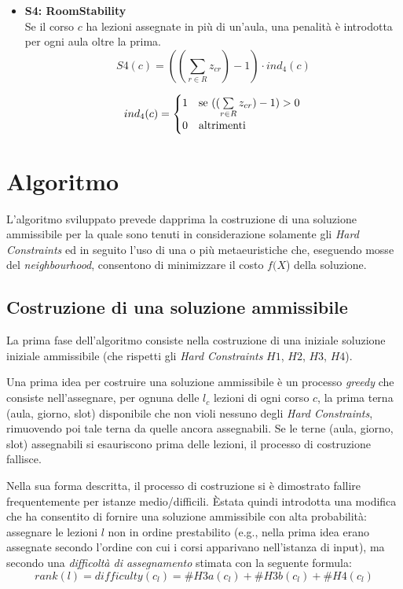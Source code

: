 \documentclass[]{article}
\newcommand{\E}{È}
\begin{document}
\begin{itemize}
	\item \textbf{S4: RoomStability} \mbox{}\\	

Se il corso $c$ ha lezioni assegnate in più di un'aula, una penalità è introdotta per ogni aula oltre la prima.
	\[ S4(c) = ((\sum_{r \in R} z_{cr}) - 1)  \cdot ind_4(c)\]

	\[ 
	ind_4(c) = 
	\begin{cases}
		1 & \text{se $ ((\sum\limits_{r \in R} z_{cr}) - 1) > 0 $} \\
		0 & \text{altrimenti}
	\end{cases}\\
	\]

\end{itemize}

\section{Algoritmo}
L'algoritmo sviluppato prevede dapprima la costruzione di una soluzione ammissibile per la quale sono tenuti in considerazione solamente gli \textit{Hard Constraints} ed in seguito l'uso di una o più metaeuristiche che, eseguendo mosse del \textit{neighbourhood}, consentono di minimizzare il costo $f(X$) della soluzione.

\subsection{Costruzione di una soluzione ammissibile}
La prima fase dell'algoritmo consiste nella costruzione di una iniziale soluzione iniziale ammissibile (che rispetti gli \textit{Hard Constraints} $H1$, $H2$, $H3$, $H4$).

Una prima idea per costruire una soluzione ammissibile è un processo \textit{greedy} che consiste nell'assegnare, per ognuna delle $l_c$ lezioni di ogni corso $c$, la prima terna (aula, giorno, slot) disponibile che non violi nessuno degli \textit{Hard Constraints}, rimuovendo poi tale terna da quelle ancora assegnabili.
Se le terne (aula, giorno, slot) assegnabili si esauriscono prima delle lezioni, il processo di costruzione fallisce.

Nella sua forma descritta, il processo di costruzione si è dimostrato fallire frequentemente per istanze medio/difficili.
\E stata quindi introdotta una modifica che ha consentito di fornire una soluzione ammissibile con alta probabilità: assegnare le lezioni $l$ non in ordine prestabilito (e.g., nella prima idea erano assegnate secondo l'ordine con cui i corsi apparivano nell'istanza di input), ma secondo una \textit{difficoltà di assegnamento} stimata con la seguente formula:
\[ \mathit{rank(l)} = \mathit{difficulty(c_l)} = \#{H3a}(c_l) + 	\#{H3b}(c_l) + \#{H4}(c_l) \]
\end{document}
